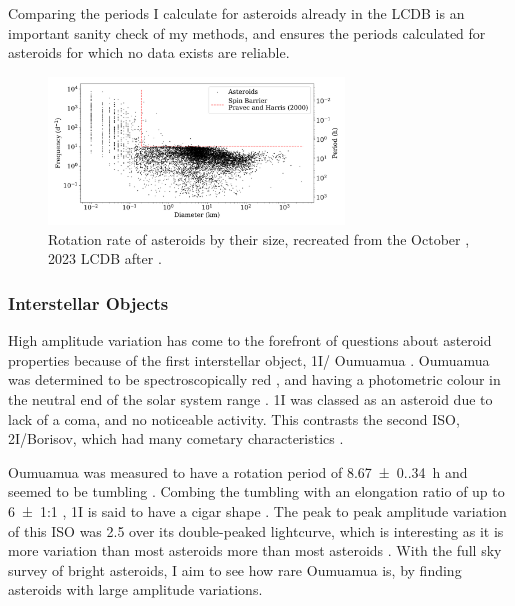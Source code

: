 \documentclass{UCreport}
\DeclareRobustCommand{\okina}{%
  \raisebox{\dimexpr\fontcharht\font`A-\height}{%
    \scalebox{0.8}{`}%
  }%
}
\newcommand{\omuamua}{\okina Oumuamua } %
\begin{document}
Comparing the periods I calculate for asteroids already in the LCDB is an important sanity check of my methods, and ensures the periods calculated for asteroids for which no data exists are reliable.

\begin{figure}[h]
  \centering
  \includegraphics[width=0.7\textwidth]{./Figures/Diam-FreqPlot.pdf}
  \caption[Asteroid frequencies against diameter (LCDB)]{
    Rotation rate of asteroids by their size, recreated from the  October , 2023 LCDB after \citet{Warner2009}.
  }
  \label{Fig:FreqVsDiam}
\end{figure}

\subsubsection*{Interstellar Objects}
High amplitude variation has come to the forefront of questions about asteroid properties because of the first interstellar object, 1I/\omuamua \citep[see][for a review]{Bannister2019}.
\omuamua was determined to be spectroscopically red \citep{Fitzsimmons2017, Meech2017}, and having a photometric colour in the neutral end of the solar system range \citep{Bannister2017}.
1I was classed as an asteroid due to lack of a coma, and no noticeable activity.
This contrasts the second ISO, 2I/Borisov, which had many cometary characteristics \citep[see ][for a review]{Dorofeeva2023}.

\omuamua was measured to have a rotation period of \qty{8.67(0.34)}{\hour} \citep{Belton2018} and seemed to be tumbling \citep[e.g.][]{Drahus2018,Fraser2018}.
Combing the tumbling with an elongation ratio of up to \qty{6(1)}{}:1 \citep{McNeill2018}, 1I is said to have a cigar shape \citep{Belton2018}.
The peak to peak amplitude variation of this ISO was \qty{2.5}{\mag} \citep{Meech2017} over its double-peaked lightcurve, which is interesting as it is more variation than most asteroids more than most asteroids \citep[as seen in the LCDB of][]{Warner2009}.
With the full sky survey of bright asteroids, I aim to see how rare \omuamua is, by finding asteroids with large amplitude variations.
\end{document}
